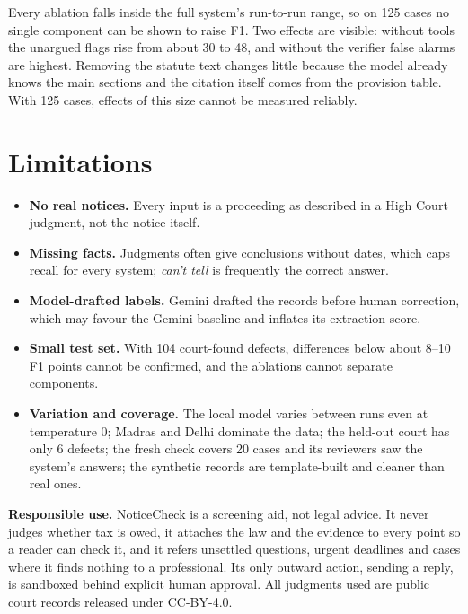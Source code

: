 \documentclass[10pt,a4paper]{article}
\begin{document}
Every ablation falls inside the full system's run-to-run range, so on 125 cases no single component can be shown to raise F1. Two effects are visible: without tools the unargued flags rise from about 30 to 48, and without the verifier false alarms are highest. Removing the statute text changes little because the model already knows the main sections and the citation itself comes from the provision table. With 125 cases, effects of this size cannot be measured reliably.

\section{Limitations}
\begin{itemize}
\item \textbf{No real notices.} Every input is a proceeding as described in a High Court judgment, not the notice itself.
\item \textbf{Missing facts.} Judgments often give conclusions without dates, which caps recall for every system; \emph{can't tell} is frequently the correct answer.
\item \textbf{Model-drafted labels.} Gemini drafted the records before human correction, which may favour the Gemini baseline and inflates its extraction score.
\item \textbf{Small test set.} With 104 court-found defects, differences below about 8--10 F1 points cannot be confirmed, and the ablations cannot separate components.
\item \textbf{Variation and coverage.} The local model varies between runs even at temperature 0; Madras and Delhi dominate the data; the held-out court has only 6 defects; the fresh check covers 20 cases and its reviewers saw the system's answers; the synthetic records are template-built and cleaner than real ones.
\end{itemize}

\textbf{Responsible use.} NoticeCheck is a screening aid, not legal advice. It never judges whether tax is owed, it attaches the law and the evidence to every point so a reader can check it, and it refers unsettled questions, urgent deadlines and cases where it finds nothing to a professional. Its only outward action, sending a reply, is sandboxed behind explicit human approval. All judgments used are public court records released under CC-BY-4.0.

\end{document}
